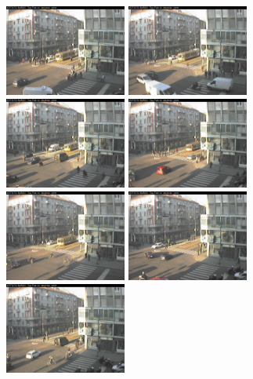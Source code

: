 \begin{figure}
	\centering
	\includegraphics[width = 4cm]{./pictures/FPSbasso/image2691}
	\includegraphics[width = 4cm]{./pictures/FPSbasso/image2692}
	\includegraphics[width = 4cm]{./pictures/FPSbasso/image2693}
	\includegraphics[width = 4cm]{./pictures/FPSbasso/image2694}
	\includegraphics[width = 4cm]{./pictures/FPSbasso/image2695}
	\includegraphics[width = 4cm]{./pictures/FPSbasso/image2696}
	\includegraphics[width = 4cm]{./pictures/FPSbasso/image2697}

\end{figure}
